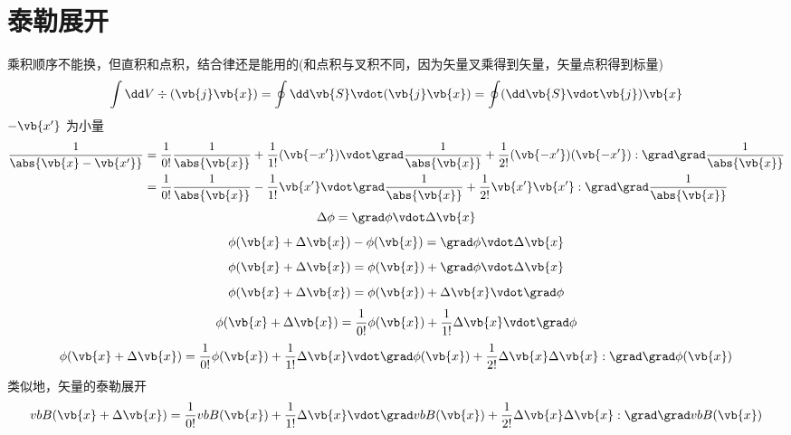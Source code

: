 \section{泰勒展开}
乘积顺序不能换，但直积和点积，结合律还是能用的(和点积与叉积不同，因为矢量叉乘得到矢量，矢量点积得到标量)
\begin{equation*}
	\int \dd V \div(\vb{j}\vb{x}) 
	= \oint \dd \vb{S} \vdot (\vb{j}\vb{x}) 
	= \oint (\dd \vb{S} \vdot \vb{j})\vb{x} 
\end{equation*}
\(- \vb{x'}\) 为小量
\begin{equation*}
	\begin{aligned}
	\frac{1}{ \abs{\vb{x} - \vb{x'}} }
	&= \frac{1}{0!} \frac{1}{\abs{\vb{x}}}
	+ \frac{1}{1!} (\vb{-x'}) \vdot \grad \frac{1}{\abs{\vb{x}}}
	+ \frac{1}{2!} (\vb{-x'}) (\vb{-x'}) : \grad\grad \frac{1}{\abs{\vb{x}}} \\
	&= \frac{1}{0!} \frac{1}{\abs{\vb{x}}}
	- \frac{1}{1!} \vb{x'} \vdot  \grad \frac{1}{\abs{\vb{x}}}
	+ \frac{1}{2!} \vb{x'}\vb{x'} : \grad\grad \frac{1}{\abs{\vb{x}}}
	\end{aligned}
\end{equation*}
\begin{equation*}
	\Delta \phi = \grad \phi \vdot \Delta \vb{x}
\end{equation*}
\begin{equation*}
	 \phi(\vb{x} + \Delta \vb{x}) - \phi(\vb{x})  = \grad \phi \vdot \Delta \vb{x}
\end{equation*}
\begin{equation*}
	 \phi(\vb{x} + \Delta \vb{x}) = \phi(\vb{x})  + \grad \phi \vdot \Delta \vb{x}
\end{equation*}
\begin{equation*}
	 \phi(\vb{x} + \Delta \vb{x}) = \phi(\vb{x})  +  \Delta \vb{x}\vdot \grad \phi
\end{equation*}
\begin{equation*}
	 \phi(\vb{x} + \Delta \vb{x}) = \frac{1}{0!} \phi(\vb{x})  + \frac{1}{1!} \Delta \vb{x}\vdot \grad \phi
\end{equation*}
\begin{equation*}
	 \phi(\vb{x} + \Delta \vb{x}) = \frac{1}{0!} \phi(\vb{x})  +
	 \frac{1}{1!} \Delta \vb{x}\vdot \grad \phi(\vb{x})
	 + \frac{1}{2!} \Delta \vb{x} \Delta \vb{x} : \grad \grad \phi(\vb{x}) 
\end{equation*}
类似地，矢量的泰勒展开
\begin{equation*}
	 vb{B}(\vb{x} + \Delta \vb{x}) = \frac{1}{0!} vb{B}(\vb{x})  +
	 \frac{1}{1!} \Delta \vb{x}\vdot \grad vb{B}(\vb{x})
	 + \frac{1}{2!} \Delta \vb{x} \Delta \vb{x} : \grad \grad vb{B}(\vb{x}) 
\end{equation*}



